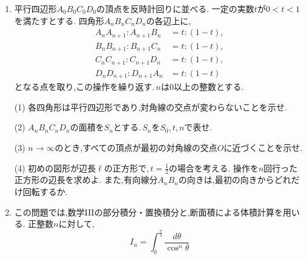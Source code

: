 \begin{enumerate}[label=\textbf{問\arabic*.},leftmargin=3.8em,format=\bookitemlink{practice-entrance}{problem}{answer}]
                \smallskip
                \noindent (3)~正整数$n$に対し,
                \[
                  \sum_{k=0}^{n}\binom{2k}{k}
                     \binom{2n-2k}{n-k}=4^n
                \]
                が成り立つことを示せ.
                \par{}
          \item 平行四辺形$A_0B_0C_0D_0$の頂点を反時計回りに並べる.
                一定の実数$t$が$0<t<1$を満たすとする.
                四角形$A_nB_nC_nD_n$の各辺上に,
                \[
                 \begin{aligned}
                 A_nA_{n+1}:A_{n+1}B_n&=t:(1-t),\\
                 B_nB_{n+1}:B_{n+1}C_n&=t:(1-t),\\
                 C_nC_{n+1}:C_{n+1}D_n&=t:(1-t),\\
                 D_nD_{n+1}:D_{n+1}A_n&=t:(1-t)
                 \end{aligned}
                \]
                となる点を取り,この操作を繰り返す.\,$n$は$0$以上の整数とする.
                \par\noindent
                (1) 各四角形は平行四辺形であり,対角線の交点が変わらないことを示せ.
                \par\noindent
                (2) $A_nB_nC_nD_n$の面積を$S_n$とする.\,$S_n$を$S_0,t,n$で表せ.
                \par\noindent
                (3) $n\to\infty$のとき,すべての頂点が最初の対角線の交点$O$に近づくことを示せ.
                \par\noindent
                (4) 初めの図形が辺長$\ell$の正方形で,\,$\displaystyle t=\frac{1}{2}$の場合を考える.
                操作を$n$回行った正方形の辺長を求めよ.
                また,有向線分$A_nB_n$の向きは,最初の向きからどれだけ回転するか.
                \par{}
          \item この問題では,数学IIIの部分積分・置換積分と,断面積による体積計算を用いる.
                正整数$n$に対して,
                \[
                 I_n=\int_0^{\frac{\pi}{3}}\frac{d\theta}{\cos^n\theta}
                \]

\end{enumerate}
